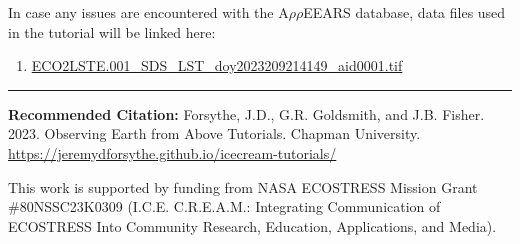 \documentclass[oneside,a4paper,11pt,explicit]{book}
\begin{document}
\vspace{2 em}

\begin{tcolorbox}[title= \Large Datafiles]
	\large
	In case any issues are encountered with the A$\rho\rho$EEARS database, data files used in the tutorial will be linked here:
	\begin{enumerate}
		\item \href{https://jeremydforsythe.github.io/icecream-tutorials/Tutorial2_AccessingRemoteSensingDataWithAppears/ECO2LSTE.001_SDS_LST_doy2023209214149_aid0001.tif}{ECO2LSTE.001\_SDS\_LST\_doy2023209214149\_aid0001.tif}
	\end{enumerate}
\end{tcolorbox}


\vfill

\hrule

\vspace{1em}

\textbf{Recommended Citation:} Forsythe, J.D., G.R. Goldsmith, and J.B. Fisher. 2023. Observing Earth from Above Tutorials. Chapman University. \url{https://jeremydforsythe.github.io/icecream-tutorials/}

\vspace{1em}

This work is supported by funding from NASA ECOSTRESS Mission Grant \#80NSSC23K0309 (I.C.E. C.R.E.A.M.: Integrating Communication of ECOSTRESS Into Community Research, Education, Applications, and Media).
\end{document}
